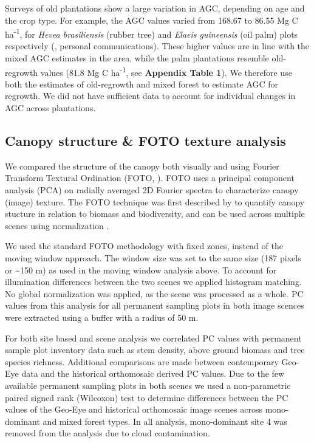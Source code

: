 \documentclass[remote sensing,article,submit,moreauthors,pdftex]{mdpi}
\begin{document}
Surveys of old plantations show a large variation in AGC, depending on
age and the crop type. For example, the AGC values varied from 168.67 to
86.55 Mg C ha\textsuperscript{-1}, for \emph{Hevea brasiliensis} (rubber
tree) and \emph{Elaeis guineensis} (oil palm) plots respectively
(\citet{bustillo2018}, personal communications). These higher values are
in line with the mixed AGC estimates in the area, while the palm
plantations resemble old-regrowth values (81.8 Mg C
ha\textsuperscript{-1}, see \textbf{Appendix Table 1}). We therefore use
both the estimates of old-regrowth and mixed forest to estimate AGC for
regrowth. We did not have sufficient data to account for individual
changes in AGC across plantations.

\hypertarget{canopy-structure-foto-texture-analysis}{%
\subsection{Canopy structure \& FOTO texture
analysis}\label{canopy-structure-foto-texture-analysis}}

We compared the structure of the canopy both visually and using Fourier
Transform Textural Ordination (FOTO, \citet{couteron2002}). FOTO uses a
principal component analysis (PCA) on radially averaged 2D Fourier
spectra to characterize canopy (image) texture. The FOTO technique was
first described by \citet{couteron2002} to quantify canopy stucture in
relation to biomass and biodiversity, and can be used across multiple
scenes using normalization \citep{Barbier2010}.

We used the standard FOTO methodology with fixed zones, instead of the
moving window approach. The window size was set to the same size (187
pixels or \textasciitilde{}150 m) as used in the moving window analysis
above. To account for illumination differences between the two scenes we
applied histogram matching. No global normalization was applied, as the
scene was processed as a whole. PC values from this analysis for all
permanent sampling plots in both image scences were extracted using a
buffer with a radius of 50 m.

For both site based and scene analysis we correlated PC values with
permanent sample plot inventory data such as stem density, above ground
biomass and tree species richness. Additional comparisons are made
between contemporary Geo-Eye data and the historical orthomosaic derived
PC values. Due to the few available permanent sampling plots in both
scenes we used a non-parametric paired signed rank (Wilcoxon) test
\citep{wilcoxon1945} to determine differences between the PC values of
the Geo-Eye and historical orthomosaic image scenes across mono-dominant
and mixed forest types. In all analysis, mono-dominant site 4 was
removed from the analysis due to cloud contamination.
\end{document}
